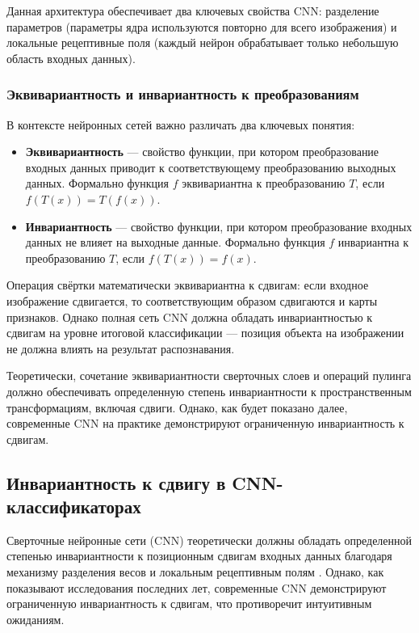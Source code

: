 Данная архитектура обеспечивает два ключевых свойства CNN: разделение параметров (параметры ядра используются повторно для всего изображения) и локальные рецептивные поля (каждый нейрон обрабатывает только небольшую область входных данных).

\subsubsection{Эквивариантность и инвариантность к преобразованиям}
\label{review:cnn:invariance_concepts}

В контексте нейронных сетей важно различать два ключевых понятия:

\begin{itemize}
    \item \textbf{Эквивариантность} — свойство функции, при котором преобразование входных данных приводит к соответствующему преобразованию выходных данных. Формально функция $f$ эквивариантна к преобразованию $T$, если $f(T(x)) = T(f(x))$.
    \item \textbf{Инвариантность} — свойство функции, при котором преобразование входных данных не влияет на выходные данные. Формально функция $f$ инвариантна к преобразованию $T$, если $f(T(x)) = f(x)$.
\end{itemize}

Операция свёртки математически эквивариантна к сдвигам: если входное изображение сдвигается, то соответствующим образом сдвигаются и карты признаков. Однако полная сеть CNN должна обладать инвариантностью к сдвигам на уровне итоговой классификации — позиция объекта на изображении не должна влиять на результат распознавания.

Теоретически, сочетание эквивариантности сверточных слоев и операций пулинга должно обеспечивать определенную степень инвариантности к пространственным трансформациям, включая сдвиги. Однако, как будет показано далее, современные CNN на практике демонстрируют ограниченную инвариантность к сдвигам.

\subsection{Инвариантность к сдвигу в CNN-классификаторах}
\label{review:invariance}

Сверточные нейронные сети (CNN) теоретически должны обладать определенной степенью инвариантности к позиционным сдвигам входных данных благодаря механизму разделения весов и локальным рецептивным полям \cite{Zhang2019blurpool}. Однако, как показывают исследования последних лет, современные CNN демонстрируют ограниченную инвариантность к сдвигам, что противоречит интуитивным ожиданиям.

